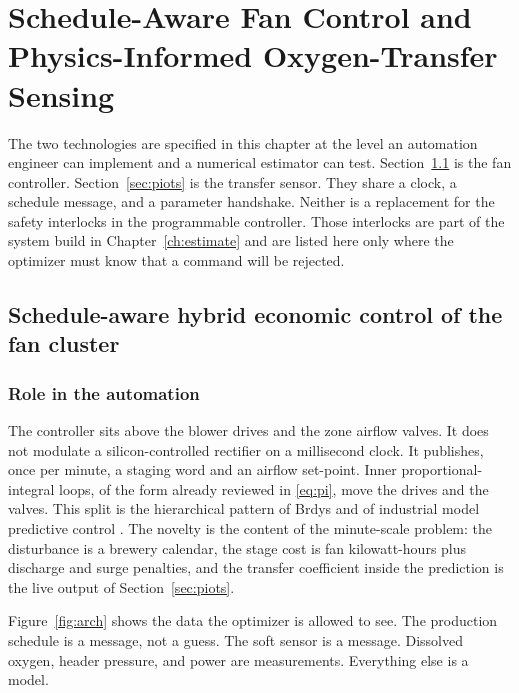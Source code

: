 \chapter{Schedule-Aware Fan Control and Physics-Informed Oxygen-Transfer Sensing}
\label{ch:method}

The two technologies are specified in this chapter at the level an automation engineer can implement and a numerical estimator can test. Section~\ref{sec:saempc} is the fan controller. Section~\ref{sec:piots} is the transfer sensor. They share a clock, a schedule message, and a parameter handshake. Neither is a replacement for the safety interlocks in the programmable controller. Those interlocks are part of the system build in Chapter~\ref{ch:estimate} and are listed here only where the optimizer must know that a command will be rejected.

\section{Schedule-aware hybrid economic control of the fan cluster}
\label{sec:saempc}

\subsection{Role in the automation}

The controller sits above the blower drives and the zone airflow valves. It does not modulate a silicon-controlled rectifier on a millisecond clock. It publishes, once per minute, a staging word and an airflow set-point. Inner proportional-integral loops, of the form already reviewed in \eqref{eq:pi}, move the drives and the valves. This split is the hierarchical pattern of Brdys and of industrial model predictive control \cite{brdys2008,qin2003mpc,engell2007}. The novelty is the content of the minute-scale problem: the disturbance is a brewery calendar, the stage cost is fan kilowatt-hours plus discharge and surge penalties, and the transfer coefficient inside the prediction is the live output of Section~\ref{sec:piots}.

Figure~\ref{fig:arch} shows the data the optimizer is allowed to see. The production schedule is a message, not a guess. The soft sensor is a message. Dissolved oxygen, header pressure, and power are measurements. Everything else is a model.

